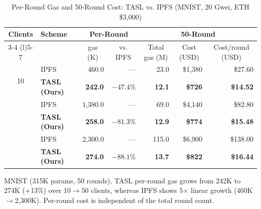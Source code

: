 \begin{table}[t]
\centering
\caption{Per-Round Gas and 50-Round Cost: TASL vs. IPFS (MNIST, 20 Gwei, ETH \$3,000)}
\label{tab:gas_analysis}
\small
\setlength{\tabcolsep}{5.5pt}
\renewcommand{\arraystretch}{1.22}

\begin{threeparttable}
\begin{tabular}{@{}clrrrrr@{}}
\toprule
\multirow{2}{*}{\textbf{Clients}}
& \multirow{2}{*}{\textbf{Scheme}}
& \multicolumn{2}{c}{\textbf{Per-Round}}
& \multicolumn{3}{c}{\textbf{50-Round}} \\
\cmidrule(lr){3-4}
\cmidrule(l){5-7}
& & \multicolumn{1}{c}{gas (K)}
  & \multicolumn{1}{c}{vs. IPFS}
  & \multicolumn{1}{c}{Total gas (M)}
  & \multicolumn{1}{c}{Cost (USD)}
  & \multicolumn{1}{c}{Cost/round (USD)} \\
\midrule

\multirow{2}{*}{10}
& IPFS~\cite{majeed2019flchain}
& 460.0 & --- & 23.0 & \$1,380 & \$27.60 \\
& \textbf{TASL (Ours)}
& \textbf{242.0} & \textbf{$-47.4\%$}
& \textbf{12.1} & \textbf{\$726} & \textbf{\$14.52} \\
\addlinespace[3pt]

\multirow{2}{*}{30}
& IPFS
& 1,380.0 & --- & 69.0 & \$4,140 & \$82.80 \\
& \textbf{TASL (Ours)}
& \textbf{258.0} & \textbf{$-81.3\%$}
& \textbf{12.9} & \textbf{\$774} & \textbf{\$15.48} \\
\addlinespace[3pt]

\multirow{2}{*}{\textbf{50}}
& IPFS
& 2,300.0 & --- & 115.0 & \$6,900 & \$138.00 \\
& \textbf{TASL (Ours)}
& \textbf{274.0} & \textbf{$-88.1\%$}
& \textbf{13.7} & \textbf{\$822} & \textbf{\$16.44} \\

\bottomrule
\end{tabular}

\begin{tablenotes}[flushleft]
\footnotesize
\item MNIST (315K params, 50 rounds). TASL per-round gas grows from 242K to 274K
(+13\%) over 10$\to$50 clients, whereas IPFS shows 5$\times$ linear growth
(460K$\to$2{,}300K). Per-round cost is independent of the total round count.
\end{tablenotes}
\end{threeparttable}
\end{table}

